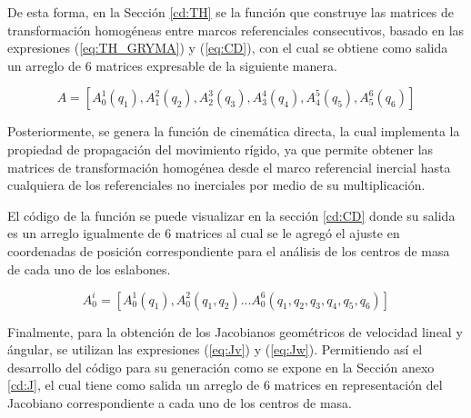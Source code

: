     De esta forma, en la Sección \ref{cd:TH} se la función que construye  
    las matrices de transformación homogéneas entre marcos referenciales consecutivos, basado 
    en las expresiones (\ref{eq:TH_GRYMA}) y (\ref{eq:CD}), con el cual se obtiene como salida un arreglo de 6 matrices 
    expresable de la siguiente manera.

    \begin{equation*}
        A = [A^1_0(q_1), A^2_1(q_2), A^3_2(q_3), A^4_3(q_4), A^5_4(q_5), A^6_5(q_6)]
    \end{equation*}

    Posteriormente, se genera la función 
    de cinemática directa, la cual implementa la propiedad de propagación del movimiento 
    rígido, ya que permite obtener las matrices de transformación homogénea desde el marco 
    referencial inercial hasta cualquiera de los referenciales no inerciales por medio de su multiplicación. 

    El código de la función se puede visualizar en la sección \ref{cd:CD} donde su salida es un arreglo igualmente de 
    6 matrices al cual se le agregó el ajuste en coordenadas de posición correspondiente para 
    el análisis de los centros de masa de cada uno de los eslabones.

    \begin{equation*}
        A^i_0 = [A^1_0(q_1), A^2_0(q_1,q_2)...A^6_0(q_1,q_2,q_3,q_4,q_5,q_6)]
    \end{equation*}

    Finalmente, para la obtención de los Jacobianos geométricos de velocidad lineal y ángular, 
    se utilizan las expresiones (\ref{eq:Jv}) y (\ref{eq:Jw}). Permitiendo así el desarrollo del código para su
    generación como se expone en la Sección anexo \ref{cd:J}, el cual tiene como salida un arreglo de 6 matrices en
    representación del Jacobiano correspondiente a cada uno de los centros de masa.


